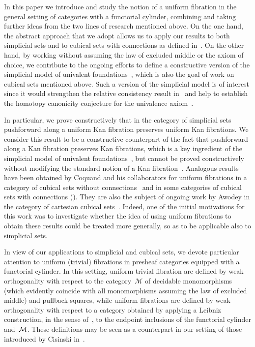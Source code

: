 \documentclass[reqno,10pt,a4paper,oneside,draft]{amsart}
\begin{document}
In this paper we introduce and study the notion of a uniform fibration in the general setting of categories with a functorial cylinder, combining and taking further ideas from the two lines of research mentioned above.
On the one hand, the abstract approach that we adopt allows us to apply our results to both simplicial sets and to cubical sets with connections as defined in~\cite{coquand-variation}.
On the other hand, by working without assuming the law of excluded middle or the axiom of choice, we contribute to the ongoing efforts to define a constructive version of the simplicial model of univalent foundations~\cite{voevodsky-simplicial-model}, which is also the goal of work on cubical sets mentioned above.
Such a version of the simplicial model is of interest since it would strengthen the relative consistency result in~\cite[Theorem~3.4.3]{voevodsky-simplicial-model} and help to establish the homotopy canonicity conjecture for the univalence axiom~\cite[Conjecture~1]{voevodsky:uf}.

In particular, we prove constructively that in the category of simplicial sets pushforward along a uniform Kan fibration preserves uniform Kan fibrations.
We consider this result to be a constructive counterpart of the fact that pushforward along a Kan fibration preserves Kan fibrations, which is a key ingredient of the simplicial model of univalent foundations~\cite[Lemma~2.3.1]{voevodsky-simplicial-model}, but cannot be proved constructively without modifying the standard notion of a Kan fibration~\cite{coquand-non-constructivity-kan}.
Analogous results have been obtained by Coquand and his collaborators for uniform fibrations in a category of cubical sets without connections~\cite{coquand-cubical-sets,huber-thesis} and in some categories of cubical sets with connections (\cf \cite{coquand-face,coquand-variation}).
They are also the subject of ongoing work by Awodey in the category of cartesian cubical sets~\cite{awodey-cubical}.
Indeed, one of the initial motivations for this work was to investigate whether the idea of using uniform fibrations to obtain these results could be treated more generally, so as to be applicable also to simplicial sets.

In view of our applications to simplicial and cubical sets, we devote particular attention to uniform (trivial) fibrations in presheaf categories equipped with a functorial cylinder.
In this setting, uniform trivial fibration are defined by weak orthogonality with respect to the category~$\mathcal{M}$ of decidable monomorphisms (which evidently coincide with all monomorphisms assuming the law of excluded middle) and pullback squares, while uniform fibrations are defined by weak orthogonality with respect to a category obtained by applying a Leibniz construction, in the sense of~\cite{riehl-verity:reedy}, to the endpoint inclusions of the functorial cylinder and~$\cal{M}$.
These definitions may be seen as a counterpart in our setting of those introduced by Cisinski in~\cite{cisinski-asterisque}.
\end{document}
